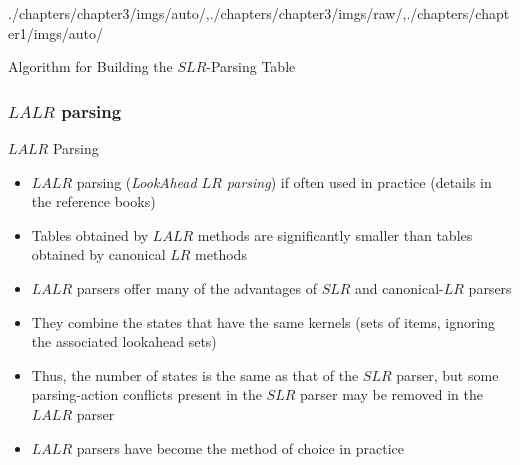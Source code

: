 \begin{graphicspathcontext}{{./chapters/chapter3/imgs/auto/},{./chapters/chapter3/imgs/raw/},{./chapters/chapter1/imgs/auto/}}
\begin{bibunit}[apalike]
\begin{frame}[t]{Algorithm for Building the $SLR$-Parsing Table}
	\tiny\larger
	\vspace{-.24cm}
	\begin{myalgorithm}
	\end{myalgorithm}
\end{frame}

\subsubsection{$LALR$ parsing}
\subsubsectiontableofcontentslide

\begin{frame}[background={10}]{$LALR$ Parsing}
	\begin{itemize}
	\item $LALR$ parsing (\emph{LookAhead $LR$ parsing}) if often used in practice (details in the reference books)
	\item Tables obtained by $LALR$ methods are significantly smaller than tables obtained by canonical $LR$ methods
	\item $LALR$ parsers offer many of the advantages of $SLR$ and canonical-$LR$ parsers
	\item They combine the states that have the same kernels (sets of items, ignoring the associated lookahead sets)
	\item Thus, the number of states is the same as that of the $SLR$ parser, but some parsing-action conflicts present in the $SLR$ parser may be removed in the $LALR$ parser
	\item $LALR$ parsers have become the method of choice in practice
	\end{itemize}
\end{frame}


\end{bibunit}
\end{graphicspathcontext}
